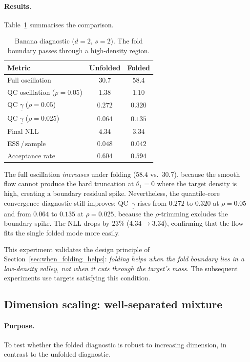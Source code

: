 \paragraph{Results.}
Table~\ref{tab:banana} summarises the comparison.

\begin{table}[t]
\centering
\caption{Banana diagnostic ($d = 2$, $s = 2$).
  The fold boundary passes through a high-density region.}
\label{tab:banana}
\smallskip
\begin{tabular}{lcc}
\hline
Metric & Unfolded & Folded \\
\hline
Full oscillation & $30.7$ & $58.4$ \\
QC oscillation ($\rho = 0.05$) & $1.38$ & $1.10$ \\
QC $\underline{\gamma}$ ($\rho = 0.05$) & $0.272$ & $0.320$ \\
QC $\underline{\gamma}$ ($\rho = 0.025$) & $0.064$ & $0.135$ \\
Final NLL & $4.34$ & $3.34$ \\
ESS\,/\,sample & $0.048$ & $0.042$ \\
Acceptance rate & $0.604$ & $0.594$ \\
\hline
\end{tabular}
\end{table}

The full oscillation \emph{increases} under folding ($58.4$ vs.\
$30.7$), because the smooth flow cannot produce the hard truncation
at $\theta_1 = 0$ where the target density is high, creating a
boundary residual spike.  Nevertheless, the quantile-core
convergence diagnostic still improves: QC~$\underline{\gamma}$ rises
from $0.272$ to $0.320$ at $\rho = 0.05$ and from $0.064$ to $0.135$
at $\rho = 0.025$, because the $\rho$-trimming excludes the boundary
spike.  The NLL drops by $23\%$ ($4.34 \to 3.34$), confirming
that the flow fits the single folded mode more easily.

This experiment validates the design principle of
Section~\ref{sec:when_folding_helps}: \emph{folding helps when the
fold boundary lies in a low-density valley, not when it cuts through
the target's mass}.  The subsequent experiments use targets
satisfying this condition.


\subsection{Dimension scaling: well-separated mixture}
\label{sec:exp_dimension}

\paragraph{Purpose.}
To test whether the folded diagnostic is robust to increasing
dimension, in contrast to the unfolded diagnostic.

